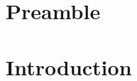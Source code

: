 \documentclass[a4paper,twoside]{ociamthesis}
\newcommand\otherpagedecoration{%
\begin{tikzpicture}[remember picture,overlay,shorten >= -10pt]

\coordinate (aux1) at ([yshift=-15pt]current page.north east);
\coordinate (aux2) at ([yshift=-410pt]current page.north east);
\coordinate (aux3) at ([xshift=-4.5cm]current page.north east);
\coordinate (aux4) at ([yshift=-150pt]current page.north east);

\begin{scope}[titlepagecolor!40,line width=12pt,rounded corners=12pt]
\draw
  (aux1) -- coordinate (a)
  ++(225:5) --
  ++(-45:5.1) coordinate (b);
\draw[shorten <= -10pt]
  (aux3) --
  (a) --
  (aux1);
\draw[opacity=0.6,titlepagecolor,shorten <= -10pt]
  (b) --
  ++(225:2.2) --
  ++(-45:2.2);
\end{scope}
\draw[titlepagecolor,line width=8pt,rounded corners=8pt,shorten <= -10pt]
  (aux4) --
  ++(225:0.8) --
  ++(-45:0.8);
\end{tikzpicture}%
}
\begin{document}
\begin{romanpages}
\flushbottom

\tableofcontents%

\listoffigures%
	\mtcaddchapter

\listoftables
	\mtcaddchapter



\end{romanpages}


\flushbottom
\part*{Preamble}

\part{Introduction}
\label{part:introduction}




\end{document}
